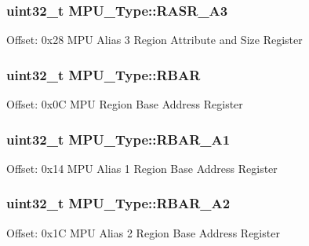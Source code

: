 \subsubsection[{\texorpdfstring{R\+A\+S\+R\+\_\+\+A3}{RASR_A3}}]{ uint32\+\_\+t M\+P\+U\+\_\+\+Type\+::\+R\+A\+S\+R\+\_\+\+A3}\hypertarget{structMPU__Type_aced0b908173b9a4bae4f59452f0cdb0d}{}\label{structMPU__Type_aced0b908173b9a4bae4f59452f0cdb0d}
Offset\+: 0x28 M\+PU Alias 3 Region Attribute and Size Register 
\subsubsection[{\texorpdfstring{R\+B\+AR}{RBAR}}]{ uint32\+\_\+t M\+P\+U\+\_\+\+Type\+::\+R\+B\+AR}\hypertarget{structMPU__Type_a3f2e2448a77aadacd9f394f6c4c708d9}{}\label{structMPU__Type_a3f2e2448a77aadacd9f394f6c4c708d9}
Offset\+: 0x0C M\+PU Region Base Address Register 
\subsubsection[{\texorpdfstring{R\+B\+A\+R\+\_\+\+A1}{RBAR_A1}}]{ uint32\+\_\+t M\+P\+U\+\_\+\+Type\+::\+R\+B\+A\+R\+\_\+\+A1}\hypertarget{structMPU__Type_a4dbcffa0a71c31e521b645b34b40e639}{}\label{structMPU__Type_a4dbcffa0a71c31e521b645b34b40e639}
Offset\+: 0x14 M\+PU Alias 1 Region Base Address Register 
\subsubsection[{\texorpdfstring{R\+B\+A\+R\+\_\+\+A2}{RBAR_A2}}]{ uint32\+\_\+t M\+P\+U\+\_\+\+Type\+::\+R\+B\+A\+R\+\_\+\+A2}\hypertarget{structMPU__Type_a8703a00626dba046b841c0db6c78c395}{}\label{structMPU__Type_a8703a00626dba046b841c0db6c78c395}
Offset\+: 0x1C M\+PU Alias 2 Region Base Address Register 
